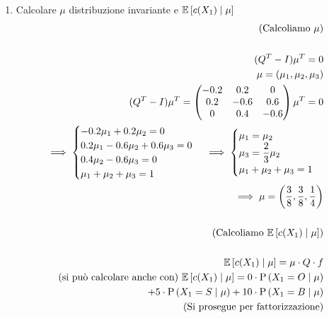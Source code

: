 \begin{enumerate}
	\item Calcolare $\mu$ distribuzione invariante e $\mathbb{E}\left[c(X_1) \mid \mu\right]$
\begin{equation*}
	\begin{aligned}
	(\text{Calcoliamo } \mu )\\ \\
	(Q^T - I) \mu^T = 0 \\
	\mu = (\mu_1, \mu_2, \mu_3) \\
	(Q^T - I)\mu^T = \begin{pmatrix}
	-0.2 & 0.2 & 0 \\ 
	0.2 & -0.6 & 0.6 \\
	0 & 0.4 & -0.6
	\end{pmatrix} \mu^T = 0 \\
	\implies \begin{cases}
	-0.2 \mu_1 + 0.2 \mu_2 = 0 \\
	0.2 \mu_1 - 0.6 \mu_2 + 0.6 \mu_3 = 0 \\
	 0.4 \mu_2 - 0.6 \mu_3 = 0 \\
	 \mu_1 + \mu_2 + \mu_3 = 1
	\end{cases} 
	\implies \begin{cases}
	\mu_1 = \mu_2 \\
	\mu_3 = \dfrac{2}{3} \mu_2 \\
 	\mu_1 + \mu_2 + \mu_3 = 1
	\end{cases} \\
	\implies \mu = \left(\dfrac{3}{8}, \dfrac{3}{8}, \dfrac{1}{4}\right) \\ \\
	(\text{Calcoliamo } \mathbb{E}\left[c(X_1) \mid \mu\right]) \\ \\
	\mathbb{E}\left[c(X_1) \mid \mu\right] = \mu \cdot Q \cdot f \\
	\text{(si pu\`o calcolare anche con) }
	\mathbb{E}\left[c(X_1) \mid \mu\right] =0 \cdot \text{P}\left(X_1 = O \mid \mu\right) \\
	+ 5 \cdot \text{P}\left(X_1 = S \mid \mu\right) + 10 \cdot \text{P}\left(X_1 = B \mid \mu\right) \\
	\text{(Si prosegue per fattorizzazione)}
	\end{aligned} 
\end{equation*}
\end{enumerate}

